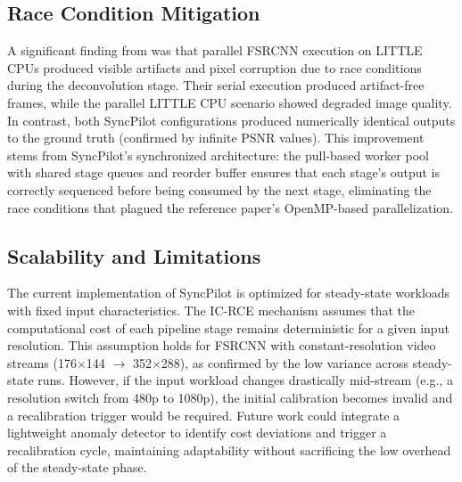 \documentclass[conference]{IEEEtran}
\begin{document}
\subsection{Race Condition Mitigation}
A significant finding from \cite{annisa2025fsrcnn} was that parallel FSRCNN execution on LITTLE CPUs produced visible artifacts and pixel corruption due to race conditions during the deconvolution stage. Their serial execution produced artifact-free frames, while the parallel LITTLE CPU scenario showed degraded image quality. In contrast, both SyncPilot configurations produced numerically identical outputs to the ground truth (confirmed by infinite PSNR values). This improvement stems from SyncPilot's synchronized architecture: the pull-based worker pool with shared stage queues and reorder buffer ensures that each stage's output is correctly sequenced before being consumed by the next stage, eliminating the race conditions that plagued the reference paper's OpenMP-based parallelization.

\subsection{Scalability and Limitations}
The current implementation of SyncPilot is optimized for steady-state workloads with fixed input characteristics. The IC-RCE mechanism assumes that the computational cost of each pipeline stage remains deterministic for a given input resolution. This assumption holds for FSRCNN with constant-resolution video streams (176$\times$144 $\rightarrow$ 352$\times$288), as confirmed by the low variance across steady-state runs. However, if the input workload changes drastically mid-stream (e.g., a resolution switch from 480p to 1080p), the initial calibration becomes invalid and a recalibration trigger would be required. Future work could integrate a lightweight anomaly detector to identify cost deviations and trigger a recalibration cycle, maintaining adaptability without sacrificing the low overhead of the steady-state phase.

\end{document}
